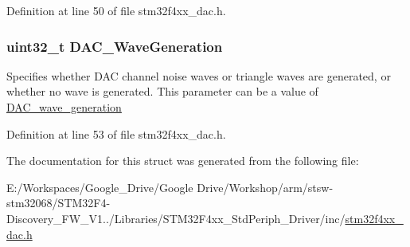 Definition at line 50 of file stm32f4xx\-\_\-dac.\-h.

\hypertarget{struct_d_a_c___init_type_def_a3dfc2e2197154ed20469e57ccff591d3}{
\subsubsection[{D\-A\-C\-\_\-\-Wave\-Generation}]{\setlength{\rightskip}{0pt plus 5cm}uint32\-\_\-t D\-A\-C\-\_\-\-Wave\-Generation}}\label{struct_d_a_c___init_type_def_a3dfc2e2197154ed20469e57ccff591d3}
Specifies whether D\-A\-C channel noise waves or triangle waves are generated, or whether no wave is generated. This parameter can be a value of \hyperlink{group___d_a_c__wave__generation}{D\-A\-C\-\_\-wave\-\_\-generation} 

Definition at line 53 of file stm32f4xx\-\_\-dac.\-h.



The documentation for this struct was generated from the following file\-:\begin{DoxyCompactItemize}
\item 
E\-:/\-Workspaces/\-Google\-\_\-\-Drive/\-Google Drive/\-Workshop/arm/stsw-\/stm32068/\-S\-T\-M32\-F4-\/\-Discovery\-\_\-\-F\-W\-\_\-\-V1../\-Libraries/\-S\-T\-M32\-F4xx\-\_\-\-Std\-Periph\-\_\-\-Driver/inc/\hyperlink{stm32f4xx__dac_8h}{stm32f4xx\-\_\-dac.\-h}\end{DoxyCompactItemize}
